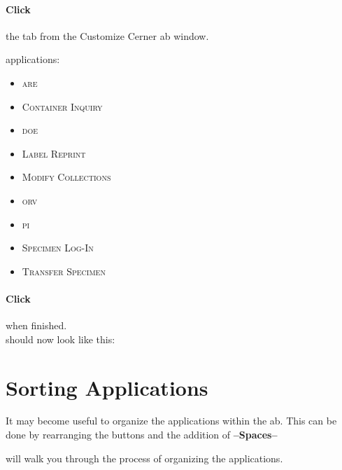\paragraph{Click} the  tab from the Customize Cerner \gls{ab} window.\\


 applications:\\

\begin{minipage}{.9\textwidth}
    \begin{itemize}[label={-}]\small
            \item \textsc{\gls{are}}
            \item \textsc{Container Inquiry}
            \item \textsc{\gls{doe}}
            \item \textsc{Label Reprint}
            \item \textsc{Modify Collections}
            \item \textsc{\gls{orv}}
            \item \textsc{\gls{pi}}
            \item \textsc{Specimen Log-In}
            \item \textsc{Transfer Specimen}
    \end{itemize}
\end{minipage}

\paragraph{Click}  when finished.\\

 should now look like this:\\


\section{Sorting Applications}
It may become useful to organize the applications within the \gls{ab}. This can be done by rearranging the buttons and the addition of \textbf{--Spaces--}

 will walk you through the process of organizing the applications.

